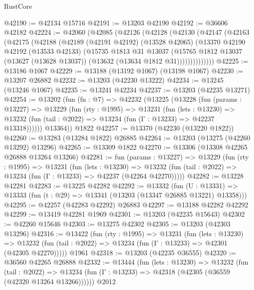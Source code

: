 \begin{lexlean}{RustCore}
\begin{coremodule}
@42190 := @42134 @15716
@42191 := @13203 @42190
@42192 := @36606 @42182
@42224 := @42060
    (@42085
      (@42126
        (@42128
          (@42130
            (@42147
              (@42163
                (@42175
                  (@42188
                    (@42189
                      (@42191 @42192)
                      (@13528 @42065)
                      (@13370
                        @42190
                        @42192
                        (@13533 @42133)
                        (@15735
                          @1813
                          @31
                          @13037
                          (@15765
                            @1812
                            @13037
                            (@13627 (@13628 @13037))
                            (@13632 (@13634 @1812 @31))))))))))))))
@42225 := @13186 @1067
@42229 := @13188 (@13192 @1067) (@13198 @1067)
@42230 := @13207 @26882
@42232 := @13203 (@42230 @13222)
@42234 := @13245 (@13246 @1067)
@42235 := @13241 @42234
@42237 := @13203 (@42235 @13271)
@42254 := @13202
    (fun (fn : @7) =>
    @42232
      (@13225
        (@13228
          (fun (params : @13227) =>
          @13229
            (fun (rty : @1995) =>
            @13231
              (fun (lets : @13230) =>
              @13232 (fun (tail : @2022) => @13234 (fun (Γ : @13233) => @42237 @13318))))))
        @13364))
    @1822
@42257 := @13370 (@42230 (@13220 @1822))
@42260 := @13283 (@13284 @1822) @26885
@42264 := @13203 (@13275 (@42260 @13292) @13296)
@42265 := @13309 @1822
@42270 := @13306 (@13308 @42265 @26888 @13264 @13266)
@42281 := fun (params : @13227) =>
  @13229
    (fun (rty : @1995) =>
    @13231
      (fun (lets : @13230) =>
      @13232 (fun (tail : @2022) => @13234 (fun (Γ : @13233) => @42237 (@42264 @42270)))))
@42282 := @13228 @42281
@42283 := @13225 @42282
@42292 := @13332
    (fun (U : @13331) => @13333 (fun (t : @29) => @13341 (@13203 (@13347 @26885 @13221) @13358)))
@42295 := @42257 (@42283 @42292) @26883
@42297 := @13188 @42282 @42292
@42299 := @13419 @42281 @1969
@42301 := @13203 (@42235 @15643)
@42302 := @42260 @15646
@42303 := @13275 @42302
@42305 := @13203 (@42303 @13296)
@42316 := @13422
    (fun (rty : @1995) =>
    @13231
      (fun (lets : @13230) =>
      @13232 (fun (tail : @2022) => @13234 (fun (Γ : @13233) => @42301 (@42305 @42270)))))
    @1961
@42318 := @13203 (@42235 @36555)
@42320 := @36560 @42265 @26888
@42332 := @13444
    (fun (lets : @13230) =>
    @13232
      (fun (tail : @2022) =>
      @13234 (fun (Γ : @13233) => @42318 (@42305 (@36559 (@42320 @13264 @13266))))))
    @2012

\end{coremodule}
\end{lexlean}
